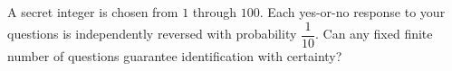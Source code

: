 A secret integer is chosen from $1$ through $100$. Each yes-or-no response to your questions is independently reversed with probability $\dfrac{1}{10}$. Can any fixed finite number of questions guarantee identification with certainty?
